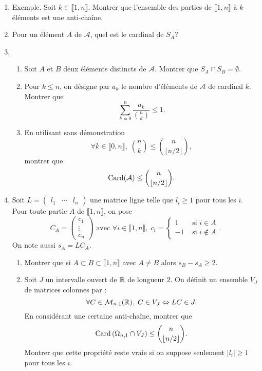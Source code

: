 \begin{enumerate}
 \item Exemple. Soit $k \in \llbracket 1,n \rrbracket$. Montrer que l'ensemble des parties de $\llbracket 1,n \rrbracket$ à $k$ éléments est une anti-chaîne.
 \item Pour un élément $A$ de $\mathcal{A}$, quel est le cardinal de $S_A$?
 \item 
 \begin{enumerate}
   \item Soit $A$ et $B$ deux éléments distincts de $\mathcal{A}$. Montrer que $S_A \cap S_B = \emptyset$.
   \item Pour $k\leq n$, on désigne par $a_k$ le nombre d'éléments de $\mathcal{A}$ de cardinal $k$. Montrer que 
 \[
  \sum_{k=0}^{n} \frac{a_k}{\binom{n}{k}}\leq 1.
 \]
   \item En utilisant sans démonstration 
 \[
  \forall k \in \llbracket 0,n\rrbracket, \; \binom{n}{k} \leq \binom{n}{\lfloor n/2 \rfloor},
 \]
montrer que 
\[
 \operatorname{Card} (\mathcal{A}) \leq \binom{n}{\lfloor n/2 \rfloor}.
\]
 \end{enumerate}
 
 \item Soit $L = \begin{pmatrix} l_1 & \cdots & l_n \end{pmatrix}$ une matrice ligne telle que $l_i\geq 1$ pour tous les $i$.\newline
 Pour toute partie $A$ de $\llbracket 1,n  \rrbracket$, on pose
 \[
  C_A = 
  \begin{pmatrix}
   c_1 \\ \vdots \\ c_n
  \end{pmatrix}
  \text{ avec } \forall i \in \llbracket 1,n \rrbracket, \;
  c_i = 
  \left\lbrace 
  \begin{aligned}
   1 &\text{ si } i \in A \\ -1 &\text{ si } i \notin A 
  \end{aligned}
  \right. .
 \]
On note aussi $s_A = L C_A$.
\begin{enumerate}
 \item Montrer que si $A \subset B \subset \llbracket 1,n \rrbracket$ avec $A\neq B$ alors $s_B - s_A \geq 2$.
 \item Soit $J$ un intervalle ouvert de $\mathbb{R}$ de longueur $2$. On définit un ensemble $V_J$ de matrices colonnes par :
 \[
  \forall C \in \mathcal{M}_{n,1}(\mathbb{R}),\; C \in V_J \Leftrightarrow L C \in J.
 \]
En considérant une certaine anti-chaîne, montrer que 
\[
 \operatorname{Card}\left( \Omega_{n,1} \cap V_J \right) \leq \binom{n}{\lfloor n/2 \rfloor}.
\]
Montrer que cette propriété reste vraie si on suppose seulement $|l_i|\geq 1$ pour tous les $i$.


\end{enumerate}
\end{enumerate}
